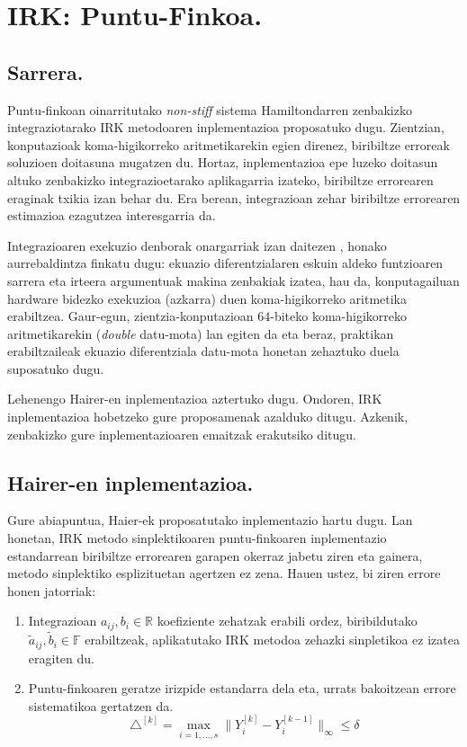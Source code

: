 \chapter{IRK: Puntu-Finkoa.}

\section{Sarrera.}


Puntu-finkoan oinarritutako \emph{non-stiff} sistema Hamiltondarren zenbakizko integraziotarako IRK metodoaren inplementazioa proposatuko dugu. Zientzian, konputazioak koma-higikorreko aritmetikarekin egien direnez, biribiltze erroreak soluzioen doitasuna mugatzen du. Hortaz, inplementazioa epe luzeko doitasun altuko zenbakizko integrazioetarako aplikagarria izateko, biribiltze errorearen eraginak txikia izan behar du. Era berean, integrazioan zehar biribiltze errorearen estimazioa ezagutzea interesgarria da. 

Integrazioaren exekuzio denborak onargarriak izan daitezen , honako aurrebaldintza finkatu dugu: ekuazio diferentzialaren eskuin aldeko funtzioaren sarrera eta irteera argumentuak makina zenbakiak izatea, hau da, konputagailuan hardware bidezko exekuzioa (azkarra) duen koma-higikorreko aritmetika erabiltzea. Gaur-egun, zientzia-konputazioan $64$-biteko koma-higikorreko aritmetikarekin (\emph{double} datu-mota) lan egiten da eta beraz, praktikan erabiltzaileak ekuazio diferentziala datu-mota honetan zehaztuko duela suposatuko dugu. 
 
Lehenengo Hairer-en inplementazioa  \cite{Hairer2008} aztertuko dugu. Ondoren, IRK inplementazioa hobetzeko gure proposamenak azalduko ditugu. Azkenik, zenbakizko gure inplementazioaren emaitzak erakutsiko ditugu.

\section{Hairer-en inplementazioa.}

Gure abiapuntua, Haier-ek \cite{Hairer2008} proposatutako inplementazio hartu dugu.  
Lan honetan, IRK metodo sinplektikoaren puntu-finkoaren inplementazio estandarrean biribiltze errorearen garapen okerraz jabetu ziren eta gainera, metodo sinplektiko esplizituetan agertzen ez zena. Hauen ustez, bi ziren errore honen jatorriak:

\begin{enumerate}
\item Integrazioan $a_{ij}, b_i \in \mathbb{R}$ koefiziente zehatzak erabili ordez, biribildutako $\tilde a_{ij},\tilde b_i \in \mathbb{F}$ erabiltzeak, aplikatutako IRK metodoa zehazki sinpletikoa ez izatea eragiten du.
\item Puntu-finkoaren geratze irizpide estandarra dela eta, urrats bakoitzean errore sistematikoa gertatzen da.
\begin{equation*}
\triangle ^{[k]} = \max_{i=1,\dots,s}\|Y_i^{[k]}-Y_i^{[k-1]}\|_{\infty} \le \delta
\end{equation*}

\end{enumerate}    

